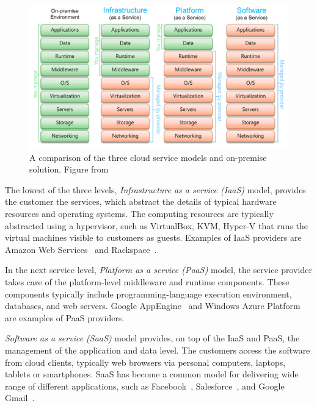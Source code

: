 \begin{figure}[]
  \begin{center}
    \includegraphics[width=\textwidth]{images/cloud-computing-service-models.png}
    \caption{A comparison of the three cloud service models and on-premise solution. Figure from~\cite{Lau:2011:ServiceModels}}
    \label{fig:cloud-computing-service-models}
  \end{center}
\end{figure}

The lowest of the three levels, \emph{Infrastructure as a service (IaaS)} model, provides the customer the services, which abstract the details of typical hardware resources and operating systems. The computing resources are typically abstracted using a hypervisor, such as VirtualBox, KVM, Hyper-V that runs the virtual machines visible to customers as guests. Examples of IaaS providers are Amazon Web Services~\cite{Murty:2008:AWS} and Rackspace~\cite{Rackspace:2010:Inc}.~\cite{Mell:2011:ccdef}

In the next service level, \emph{Platform as a service (PaaS)} model, the service provider takes care of the platform-level middleware and runtime components. These components typically include programming-language execution environment, databases, and web servers. Google AppEngine~\cite{Sanderson:2009:GoogleAppEngine} and Windows Azure Platform~\cite{Redkar:2011:Azure} are examples of PaaS providers.~\cite{Mell:2011:ccdef}

\emph{Software as a service (SaaS)} model provides, on top of the IaaS and PaaS, the management of the application and data level. The customers access the software from cloud clients, typically web browsers via personal computers, laptops, tablets or smartphones. SaaS has become a common model for delivering wide range of different applications, such as Facebook~\cite{facebook}, Salesforce~\cite{salesforce}, and Google Gmail~\cite{Teeter:2011:Gmail}.~\cite{Mell:2011:ccdef}

